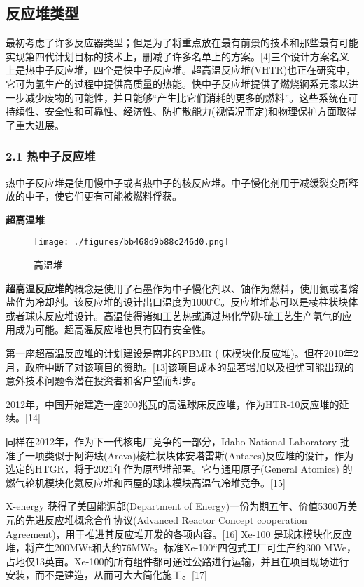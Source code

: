 \subsection{反应堆类型}
最初考虑了许多反应器类型；但是为了将重点放在最有前景的技术和那些最有可能实现第四代计划目标的技术上，删减了许多名单上的方案。[4]三个设计方案名义上是热中子反应堆，四个是快中子反应堆。超高温反应堆(VHTR)也正在研究中，它可为氢生产的过程中提供高质量的热能。快中子反应堆提供了燃烧锕系元素以进一步减少废物的可能性，并且能够“产生比它们消耗的更多的燃料”。这些系统在可持续性、安全性和可靠性、经济性、防扩散能力(视情况而定)和物理保护方面取得了重大进展。

\subsubsection{2.1 热中子反应堆}
热中子反应堆是使用慢中子或者热中子的核反应堆。中子慢化剂用于减缓裂变所释放的中子，使它们更有可能被燃料俘获。

\textbf{超高温堆}

\begin{figure}[ht]
\centering
\texttt{[image: ./figures/bb468d9b88c246d0.png]}
\caption{高温堆} \label{fig_FYD_1}
\end{figure}

\textbf{超高温反应堆的}概念是使用了石墨作为中子慢化剂以、铀作为燃料，使用氦或者熔盐作为冷却剂。该反应堆的设计出口温度为1000℃。反应堆堆芯可以是棱柱状块体或者球床反应堆设计。高温使得诸如工艺热或通过热化学碘-硫工艺生产氢气的应用成为可能。超高温反应堆也具有固有安全性。

第一座超高温反应堆的计划建设是南非的PBMR ( 床模块化反应堆)。但在2010年2月，政府中断了对该项目的资助。[13]该项目成本的显著增加以及担忧可能出现的意外技术问题令潜在投资者和客户望而却步。

2012年，中国开始建造一座200兆瓦的高温球床反应堆，作为HTR-10反应堆的延续。[14]

同样在2012年，作为下一代核电厂竞争的一部分，Idaho National Laboratory 批准了一项类似于阿海珐(Areva)棱柱状块体安塔雷斯(Antares)反应堆的设计，作为选定的HTGR，将于2021年作为原型堆部署。它与通用原子(General Atomics) 的燃气轮机模块化氦反应堆和西屋的球床模块高温气冷堆竞争。[15]

X-energy 获得了美国能源部(Department of Energy)一份为期五年、价值5300万美元的先进反应堆概念合作协议(Advanced Reactor Concept cooperation Agreement)，用于推进其反应堆开发的各项内容。[16] Xe-100 是球床模块化反应堆，将产生200MWt和大约76MWe。标准Xe-100“四包式工厂可生产约300 MWe，占地仅13英亩。Xe-100的所有组件都可通过公路进行运输，并且在项目现场进行安装，而不是建造，从而可大大简化施工。[17]

